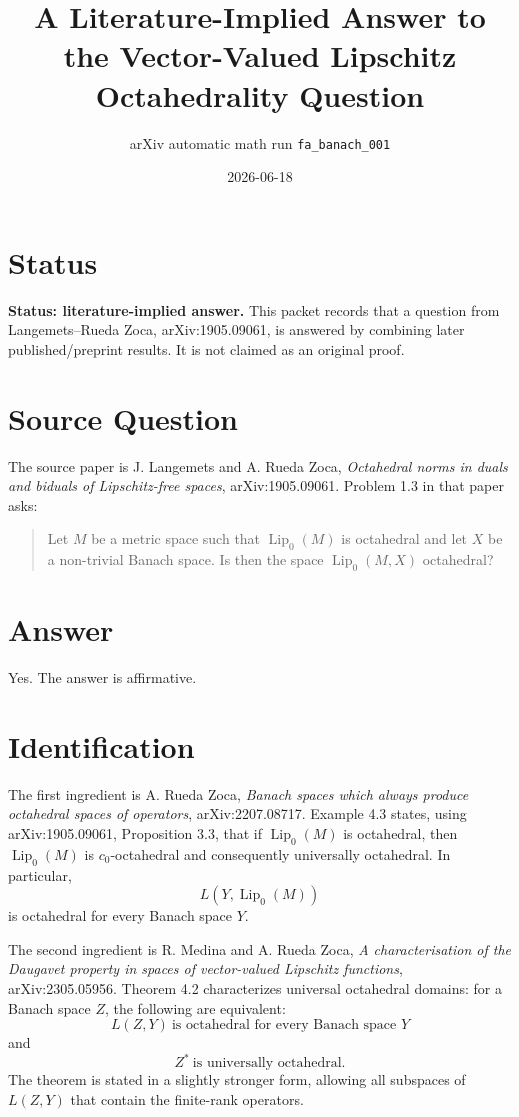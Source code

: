 \documentclass[11pt]{article}
\title{A Literature-Implied Answer to the Vector-Valued Lipschitz Octahedrality Question}
\author{arXiv automatic math run \texttt{fa\_banach\_001}}
\date{2026-06-18}
\newcommand{\Lip}{\operatorname{Lip}_0}
\begin{document}
\maketitle

\section*{Status}

\textbf{Status: literature-implied answer.}  This packet records that a
question from Langemets--Rueda Zoca, arXiv:1905.09061, is answered by combining
later published/preprint results.  It is not claimed as an original proof.

\section*{Source Question}

The source paper is J. Langemets and A. Rueda Zoca, \emph{Octahedral norms in
duals and biduals of Lipschitz-free spaces}, arXiv:1905.09061.  Problem 1.3 in
that paper asks:

\begin{quote}
Let \(M\) be a metric space such that \(\Lip(M)\) is octahedral and let \(X\)
be a non-trivial Banach space. Is then the space \(\Lip(M,X)\) octahedral?
\end{quote}

\section*{Answer}

Yes.  The answer is affirmative.

\section*{Identification}

The first ingredient is A. Rueda Zoca, \emph{Banach spaces which always produce
octahedral spaces of operators}, arXiv:2207.08717.  Example 4.3 states, using
arXiv:1905.09061, Proposition 3.3, that if \(\Lip(M)\) is octahedral, then
\(\Lip(M)\) is \(c_0\)-octahedral and consequently universally octahedral.
In particular,
\[
        L(Y,\Lip(M))
\]
is octahedral for every Banach space \(Y\).

The second ingredient is R. Medina and A. Rueda Zoca, \emph{A characterisation
of the Daugavet property in spaces of vector-valued Lipschitz functions},
arXiv:2305.05956.  Theorem 4.2 characterizes universal octahedral domains:
for a Banach space \(Z\), the following are equivalent:
\[
        L(Z,Y)\ \text{is octahedral for every Banach space }Y
\]
and
\[
        Z^*\ \text{is universally octahedral}.
\]
The theorem is stated in a slightly stronger form, allowing all subspaces of
\(L(Z,Y)\) that contain the finite-rank operators.
\end{document}
